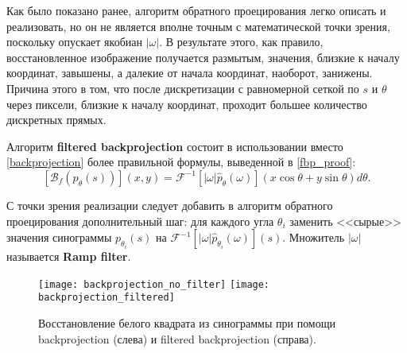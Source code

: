 
Как было показано ранее, алгоритм обратного проецирования легко описать и реализовать, но он не является вполне точным с математической точки зрения, поскольку опускает якобиан $|\omega|$. В результате этого, как правило, восстановленное изображение получается размытым, значения, близкие к началу координат, завышены, а далекие от начала координат, наоборот, занижены. Причина этого в том, что после дискретизации с равномерной сеткой по $s$ и $\theta$ через пиксели, близкие к началу координат, проходит большее количество дискретных прямых.

Алгоритм \textbf{filtered backprojection} состоит в использовании вместо \eqref{backprojection} более правильной формулы, выведенной в \eqref{fbp_proof}:
\begin{equation}
\label{filtered_backprojection}
    \left[ \mathcal{B}_{f}(p_\theta(s)) \right](x, y) = \mathcal{F}^{-1}\left[ |\omega| \hat{p}_\theta(\omega) \right]\left( x\cos\theta + y\sin\theta \right) d\theta.
\end{equation}

С точки зрения реализации следует добавить в алгоритм обратного проецирования дополнительный шаг: для каждого угла $\theta_i$ заменить <<сырые>> значения синограммы $p_{\theta_i}(s)$ на $\mathcal{F}^{-1}\left[ |\omega| \hat{p}_{\theta_i}(\omega) \right](s)$. Множитель $|\omega|$ называется \textbf{Ramp filter}.

\begin{figure}[!h]
    \centering
    \texttt{[image: backprojection\_no\_filter]}
    \texttt{[image: backprojection\_filtered]}
    \caption{Восстановление белого квадрата из синограммы при помощи backprojection (слева) и filtered backprojection (справа).}
\end{figure}
